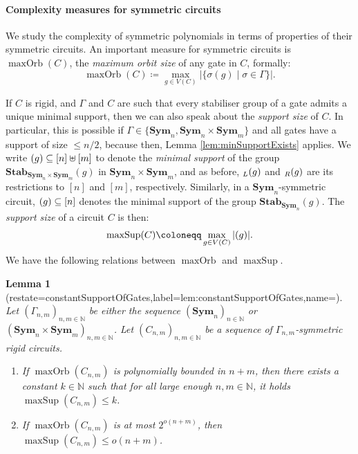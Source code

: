 \documentclass[11pt, DIV=15]{scrarticle}
\theoremstyle{definition}
\theoremstyle{plain}
\newtheorem{lemma}[definition]{Lemma}
\theoremstyle{remark}
\newcommand{\Sym}{\mathbf{Sym}}
\newcommand{\Stab}{\mathbf{Stab}}
\newcommand{\bbN}{\mathbb{N}}
\let\sup\relax
\DeclareMathOperator{\sup}{sup}
\DeclareMathOperator{\maxOrb}{maxOrb}
\DeclareMathOperator{\maxSup}{maxSup}
\begin{document}
\paragraph*{Complexity measures for symmetric circuits}
We study the complexity of symmetric polynomials in terms of properties of their symmetric circuits. 
An important measure for symmetric circuits is $\maxOrb(C)$, the \emph{maximum orbit size} of any gate in $C$, formally:
\[
\maxOrb(C) \coloneqq \max_{g \in V(C)} | \{ \sigma(g) \mid \sigma \in \Gamma \}  |.
\]

If $C$ is rigid, and $\Gamma$ and $C$ are such that every stabiliser
group of a gate admits a unique minimal support, then we can also
speak about the \emph{support size} of $C$. In particular, this is
possible if $\Gamma \in \{\Sym_n, \Sym_n \times
\Sym_m\}$ and all gates have a support of size $\leq n/2$, because then, Lemma \ref{lem:minSupportExists} applies.
We write $\sup(g) \subseteq [n] \uplus [m]$ to denote the \emph{minimal support} of the group $\Stab_{\Sym_n \times \Sym_m}(g)$ in $\Sym_n \times \Sym_m$, and as before, $\sup_L(g)$ and $\sup_R(g)$ are its restrictions to $[n]$ and $[m]$, respectively. Similarly, in a $\Sym_n$-symmetric circuit, $\sup(g) \subseteq [n]$ denotes the minimal support of the group $\Stab_{\Sym_n}(g)$.
The \emph{support size} of a circuit $C$ is then:	
\[
\maxSup(C) \coloneqq \max_{g \in V(C)} | \sup(g) |.
\]	
We have the following relations between $\maxOrb$ and $\maxSup$. 
\begin{lemma}[restate=constantSupportOfGates,label=lem:constantSupportOfGates,name=]
	\label{lem:constantSupportOfGates}
	Let $(\Gamma_{n,m})_{n,m \in \bbN}$ be either the sequence $(\Sym_n)_{n \in \bbN}$ or $(\Sym_{n} \times \Sym_{m})_{n,m \in \bbN}$.
	Let $(C_{n,m})_{n,m \in \bbN}$ be a sequence of $\Gamma_{n,m}$-symmetric rigid circuits.
	\begin{enumerate}
		\item If $\maxOrb(C_{n,m})$ is polynomially bounded in $n+m$, then there exists a constant $k \in \bbN$ such that for all large enough $n,m \in \bbN$, it holds $\maxSup(C_{n,m}) \leq k$.
		\item If $\maxOrb(C_{n,m})$ is at most $2^{o(n+m)}$, then $\maxSup(C_{n,m}) \leq o(n+m)$.
	\end{enumerate}	
\end{lemma}	
\end{document}
